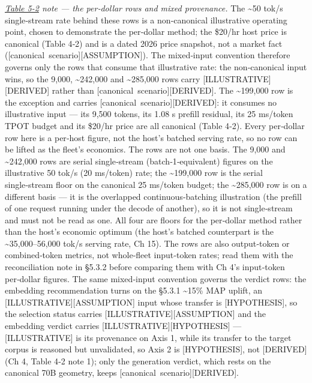 \emph{\hyperref[tab:5.2]{Table 5-2} note --- the per‑dollar rows and mixed provenance.} The
\textasciitilde50 tok/s single‑stream rate behind these rows is a
non‑canonical illustrative operating point, chosen to demonstrate the
per‑dollar method; the \$20/hr host price is canonical (Table 4‑2) and
is a dated 2026 price snapshot, not a market fact (\mbox{{[}canonical
scenario{]}}\hspace{0pt}\mbox{{[}ASSUMPTION{]}}). The mixed‑input convention therefore
governs only the rows that consume that illustrative rate: the
non‑canonical input wins, so the 9,000, \textasciitilde242,000 and
\textasciitilde285,000 rows carry \mbox{{[}ILLUSTRATIVE{]}}\hspace{0pt}\mbox{{[}DERIVED{]}} rather
than \mbox{{[}canonical scenario{]}}\hspace{0pt}\mbox{{[}DERIVED{]}}. The \textasciitilde199,000
row is the exception and carries \mbox{{[}canonical scenario{]}}\hspace{0pt}\mbox{{[}DERIVED{]}}:
it consumes no illustrative input --- its 9,500 tokens, its 1.08 s
prefill residual, its 25 ms/token TPOT budget and its \$20/hr price are
all canonical (Table 4‑2). Every per‑dollar row here is a per‑host
figure, not the host's batched serving rate, so no row can be lifted as
the fleet's economics. The rows are not one basis. The 9,000 and
\textasciitilde242,000 rows are serial single‑stream
(batch‑1‑equivalent) figures on the illustrative 50 tok/s (20 ms/token)
rate; the \textasciitilde199,000 row is the serial single‑stream floor
on the canonical 25 ms/token budget; the \textasciitilde285,000 row is
on a different basis --- it is the overlapped continuous‑batching
illustration (the prefill of one request running under the decode of
another), so it is not single‑stream and must not be read as one. All
four are floors for the per‑dollar method rather than the host's
economic optimum (the host's batched counterpart is the
\textasciitilde35,000--56,000 tok/s serving rate, Ch 15). The rows are
also output‑token or combined‑token metrics, not whole‑fleet input‑token
rates; read them with the reconciliation note in §5.3.2 before comparing
them with Ch 4's input‑token per‑dollar figures. The same mixed‑input
convention governs the verdict rows: the embedding recommendation turns
on the §5.3.1 \textasciitilde15\% MAP uplift, an
\mbox{{[}ILLUSTRATIVE{]}}\hspace{0pt}\mbox{{[}ASSUMPTION{]}} input whose transfer is
\mbox{{[}HYPOTHESIS{]}}, so the selection status carries
\mbox{{[}ILLUSTRATIVE{]}}\hspace{0pt}\mbox{{[}ASSUMPTION{]}} and the embedding verdict carries
\mbox{{[}ILLUSTRATIVE{]}}\hspace{0pt}\mbox{{[}HYPOTHESIS{]}} --- \mbox{{[}ILLUSTRATIVE{]}} is its
provenance on Axis 1, while its transfer to the target corpus is
reasoned but unvalidated, so Axis 2 is \mbox{{[}HYPOTHESIS{]}}, not
\mbox{{[}DERIVED{]}} (Ch 4, Table 4‑2 note 1); only the generation verdict,
which rests on the canonical 70B geometry, keeps \mbox{{[}canonical
scenario{]}}\hspace{0pt}\mbox{{[}DERIVED{]}}.

